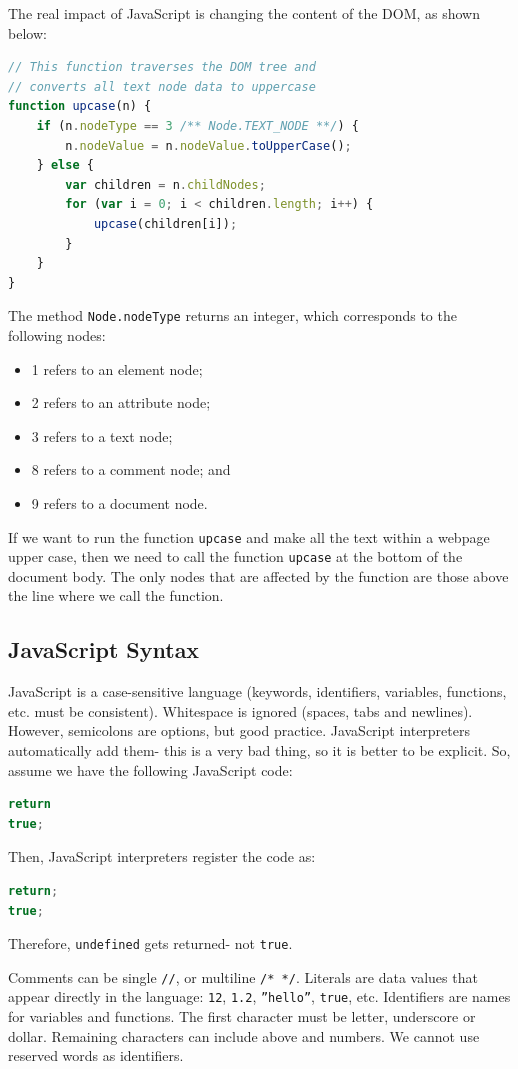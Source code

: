 \documentclass[a4paper, openany]{memoir}
\begin{document}
\noindent The real impact of JavaScript is changing the content of the DOM, as shown below:
\begin{lstlisting}[language=javascript]
// This function traverses the DOM tree and
// converts all text node data to uppercase
function upcase(n) {
    if (n.nodeType == 3 /** Node.TEXT_NODE **/) {
        n.nodeValue = n.nodeValue.toUpperCase();
    } else {
        var children = n.childNodes;
        for (var i = 0; i < children.length; i++) {
            upcase(children[i]);
        }
    }
}
\end{lstlisting}
The method \texttt{Node.nodeType} returns an integer, which corresponds to the following nodes:
\begin{itemize}
    \item 1 refers to an element node;
    \item 2 refers to an attribute node;
    \item 3 refers to a text node;
    \item 8 refers to a comment node; and
    \item 9 refers to a document node.
\end{itemize}

\noindent If we want to run the function \texttt{upcase} and make all the text within a webpage upper case, then we need to call the function \texttt{upcase} at the bottom of the document body. The only nodes that are affected by the function are those above the line where we call the function.

\subsection{JavaScript Syntax}
JavaScript is a case-sensitive language (keywords, identifiers, variables, functions, etc. must be consistent). Whitespace is ignored (spaces, tabs and newlines). However, semicolons are options, but good practice. JavaScript interpreters automatically add them- this is a very bad thing, so it is better to be explicit. So, assume we have the following JavaScript code:
\begin{lstlisting}[language=javascript]
return
true;
\end{lstlisting}
Then, JavaScript interpreters register the code as:
\begin{lstlisting}[language=javascript]
return;
true;
\end{lstlisting}
Therefore, \texttt{undefined} gets returned- not \texttt{true}.

\noindent Comments can be single \texttt{//}, or multiline \texttt{/* */}. Literals are data values that appear directly in the language: \texttt{12}, \texttt{1.2}, \texttt{''hello''}, \texttt{true}, etc. Identifiers are names for variables and functions. The first character must be letter, underscore or dollar. Remaining characters can include above and numbers. We cannot use reserved words as identifiers. 
\end{document}
